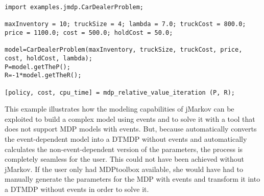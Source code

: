 \begin{lstlisting}
import examples.jmdp.CarDealerProblem;

maxInventory = 10; truckSize = 4; lambda = 7.0; truckCost = 800.0;
price = 1100.0; cost = 500.0; holdCost = 50.0;

model=CarDealerProblem(maxInventory, truckSize, truckCost, price, cost, holdCost, lambda);
P=model.getTheP();
R=-1*model.getTheR();

[policy, cost, cpu_time] = mdp_relative_value_iteration (P, R);
\end{lstlisting}
This example illustrates how the modeling capabilities of jMarkov can be
exploited to build a complex model using events and to solve it
with a tool that does not support MDP models with events. 
But, because \jMDP automatically converts the event-dependent model 
into a DTMDP without events and automatically calculates the
non-event-dependent version of the parameters, the process is completely
seamless for the user. This could not have been achieved without jMarkov. 
If the user only had MDPtoolbox available, she would have had to manually generate
the parameters for the MDP with events and transform it into a DTMDP without
events in order to solve it. 
